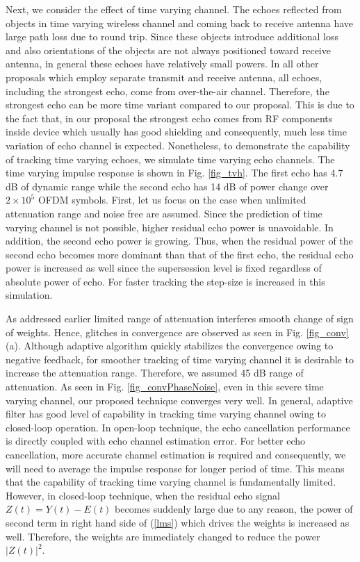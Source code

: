 \documentclass[twocolumn]{IEEEtran}
\begin{document}
Next, we consider the effect of time varying channel. The echoes
reflected from objects in time varying wireless channel and coming
back to receive antenna have large path loss due to round trip.
Since these objects introduce additional loss and also orientations
of the objects are not always positioned toward receive antenna, in
general these echoes have relatively small powers. In all other
proposals which employ separate transmit and receive antenna, all
echoes, including the strongest echo, come from over-the-air
channel. Therefore, the strongest echo can be more time variant
compared to our proposal. This is due to the fact that, in our
proposal the strongest echo comes from RF components inside device
which usually has good shielding and consequently, much less time
variation of echo channel is expected. Nonetheless, to demonstrate
the capability of tracking time varying echoes, we simulate time
varying echo channels. The time varying impulse response is shown in
Fig. \ref{fig_tvh}. The first echo has 4.7 dB of dynamic range while
the second echo has 14 dB of power change over $2\times 10^5$ OFDM
symbols. First, let us focus on the case when unlimited attenuation
range and noise free are assumed. Since the prediction of time
varying channel is not possible, higher residual echo power is
unavoidable. In addition, the second echo power is growing. Thus,
when the residual power of the second echo becomes more dominant
than that of the first echo, the residual echo power is increased as
well since the supersession level is fixed regardless of absolute
power of echo. For faster tracking the step-size is increased in
this simulation.

As addressed earlier limited range of attenuation interferes smooth
change of sign of weights. Hence, glitches in convergence are
observed as seen in Fig. \ref{fig_conv} (a). Although adaptive
algorithm quickly stabilizes the convergence owing to negative
feedback, for smoother tracking of time varying channel it is
desirable to increase the attenuation range. Therefore, we assumed
45 dB range of attenuation. As seen in Fig.
\ref{fig_convPhaseNoise}, even in this severe time varying channel,
our proposed technique converges very well. In general, adaptive
filter has good level of capability in tracking time varying channel
owing to closed-loop operation. In open-loop technique, the echo
cancellation performance is directly coupled with echo channel
estimation error. For better echo cancellation, more accurate
channel estimation is required and consequently, we will need to
average the impulse response for longer period of time. This means
that the capability of tracking time varying channel is
fundamentally limited. However, in closed-loop technique, when the
residual echo signal $Z(t)=Y(t)-E(t)$ becomes suddenly large due to
any reason, the power of second term in right hand side of
(\ref{lms}) which drives the weights is increased as well.
Therefore, the weights are immediately changed to reduce the power
$|Z(t)|^2$.
\end{document}

